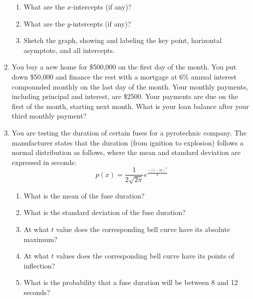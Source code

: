 \documentclass[letterpaper,12pt,fleqn]{article}
\begin{document}
\begin{enumerate}[left=0pt]
\begin{enumerate}
  \item What are the \(x\)-intercepts (if any)?

    \vspace{2in}
    
  \item What are the \(y\)-intercepts (if any)?

    \vspace{2in}

  \item Sketch the graph, showing and labeling the key point, horizontal asymptote, and all intercepts.
  \end{enumerate}

  \newpage

\item You buy a new home for \$500,000 on the first day of the month.  You put down \$50,000 and finance the rest with a
  mortgage at 6\% annual interest compounded monthly on the last day of the month.  Your monthly payments, including principal
  and interest, are \$2500.  Your payments are due on the first of the month, starting next month.  What is your loan balance
  after your third monthly payment?

  \newpage

\item You are testing the duration of certain fuses for a pyrotechnic company.  The manufacturer states that the duration
  (from ignition to explosion) follows a normal distribution as follows, where the mean and standard deviation are expressed
  in seconds:
  \[p(x)=\frac{1}{2\sqrt{2\pi}}e^{\frac{-(t-10)^2}{8}}\]
  \begin{enumerate}
  \item What is the mean of the fuse duration?

    \vspace{1in}
    
  \item What is the standard deviation of the fuse duration?

    \vspace{1in}
    
  \item At what \(t\) value does the corresponding bell curve have its absolute maximum?

    \vspace{1in}
    
  \item At what \(t\) values does the corresponding bell curve have its points of inflection?

    \vspace{1in}
    
  \item What is the probability that a fuse duration will be between 8 and 12 seconds?
  \end{enumerate}

\end{enumerate}
\end{document}
